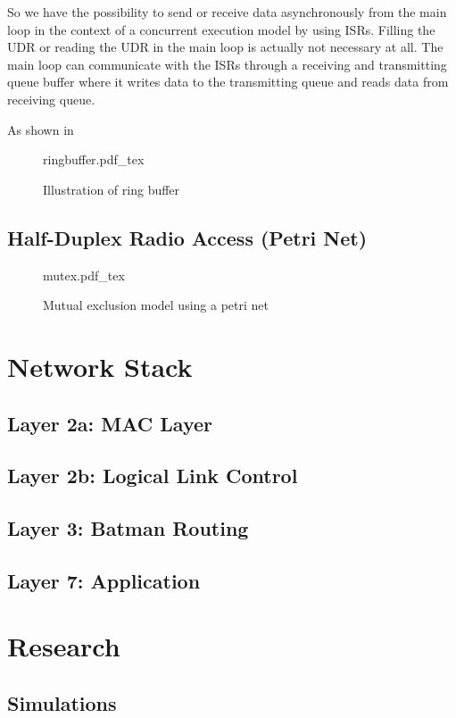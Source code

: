 So we have the possibility to send or receive data asynchronously from the main loop in the context of a concurrent execution model by using ISRs. Filling the UDR or reading the UDR in the main loop is actually not necessary at all. The main loop can communicate with the ISRs through a receiving and transmitting queue buffer where it writes data to the transmitting queue and reads data from receiving queue.

As shown in \cite{linux_device_drivers}

\begin{figure}[H]
\centering
{ringbuffer.pdf_tex}
\caption[]{Illustration of ring buffer}
\end{figure}

\section{Half-Duplex Radio Access (Petri Net)}

\begin{figure}[H]
\centering
{mutex.pdf_tex}
\caption[]{Mutual exclusion model using a petri net}
\end{figure}

\chapter{Network Stack}
\section{Layer 2a: MAC Layer}
\section{Layer 2b: Logical Link Control}
\section{Layer 3: Batman Routing}
\section{Layer 7: Application}

\chapter{Research}
\section{Simulations}
